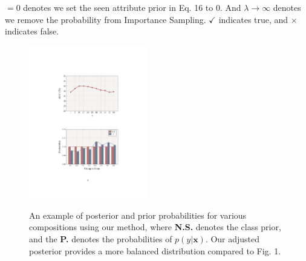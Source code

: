\documentclass[letterpaper]{article} %
\newcommand{\mx}{\mathbf{x}}
\theoremstyle{definition}
\begin{document}
 	\begin{table}[t]
		\centering
 $=0$ denotes we set the seen attribute prior in Eq. 16 to 0. And $\lambda \rightarrow \infty$ denotes we remove the probability from Importance Sampling. $\checkmark$ indicates true, and $\times$ indicates false. 
		\label{subtab.ablation3}
	\end{table}

 \begin{figure}[t]
	\centering
		\subfigure
		{
			\includegraphics[width=0.46\textwidth]{ sub_fig1.pdf}
		}

	\caption{An example of posterior and prior probabilities for various compositions using our method, where \textbf{N.S.} denotes the class prior, and the \textbf{P.} denotes the probabilities of $p(y|\mx)$. Our adjusted posterior provides a more balanced distribution compared to Fig. 1.}
	\label{sub_figre_ana}
\end{figure}
\end{document}
